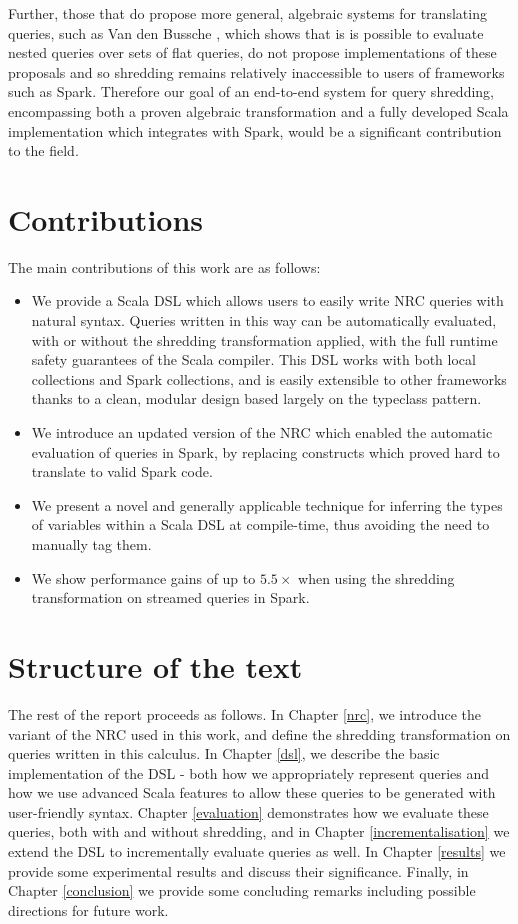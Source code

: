 {{Further, those that do propose more general, algebraic systems for translating queries, such as Van den Bussche \cite{van2001simulation}, which shows that is is possible to evaluate nested queries over sets of flat queries, do not propose implementations of these proposals and so shredding remains relatively inaccessible to users of frameworks such as Spark. Therefore our goal of an end-to-end system for query shredding, encompassing both a proven algebraic transformation and a fully developed Scala implementation which integrates with Spark, would be a significant contribution to the field.		
}



}


\section{Contributions} {
The main contributions of this work are as follows:

\begin{itemize}
\item{We provide a Scala DSL which allows users to easily write NRC queries with natural syntax. Queries written in this way can be automatically evaluated, with or without the shredding transformation applied, with the full runtime safety guarantees of the Scala compiler. This DSL works with both local collections and Spark collections, and is easily extensible to other frameworks thanks to a clean, modular design based largely on the typeclass pattern.}
\item{We introduce an updated version of the NRC which enabled the automatic evaluation of queries in Spark, by replacing constructs which proved hard to translate to valid Spark code.}
\item{We present a novel and generally applicable technique for inferring the types of variables within a Scala DSL at compile-time, thus avoiding the need to manually tag them. }
\item{We show performance gains of up to $5.5\times$ when using the shredding transformation on streamed queries in Spark.}
\end{itemize}
}

\section{Structure of the text} {
The rest of the report proceeds as follows. In Chapter \ref{nrc}, we introduce the variant of the NRC used in this work, and define the shredding transformation on queries written in this calculus. In Chapter \ref{dsl}, we describe the basic implementation of the DSL - both how we appropriately represent queries and how we use advanced Scala features to allow these queries to be generated with user-friendly syntax. Chapter \ref{evaluation} demonstrates how we evaluate these queries, both with and without shredding, and in Chapter \ref{incrementalisation} we extend the DSL to incrementally evaluate queries as well. In Chapter \ref{results} we provide some experimental results and discuss their significance. Finally, in Chapter \ref{conclusion} we provide some concluding remarks including possible directions for future work.
}
